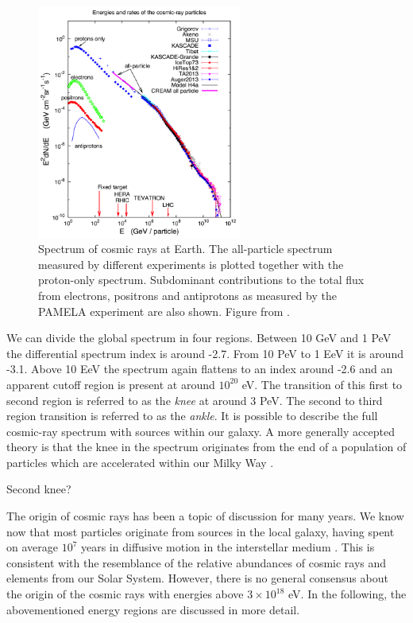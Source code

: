 \begin{figure}
\label{fig:spectrumCR}
\centering
\includegraphics[width = 0.6\textwidth]{chapter3/img/spectrumCR.png}
\caption{Spectrum of cosmic rays at Earth. The all-particle spectrum measured by different experiments is plotted together with the proton-only spectrum. Subdominant contributions to the total flux from electrons, positrons and antiprotons as measured by the PAMELA experiment are also shown. Figure from \cite{Blasi:2013rva}.}
\end{figure}

We can divide the global spectrum in four regions. Between 10 GeV and 1 PeV the differential spectrum index is around -2.7. From 10 PeV to 1 EeV it is around -3.1. Above 10 EeV the spectrum again flattens to an index around -2.6 and an apparent cutoff region is present at around $10^{20}$ eV. The transition of this first to second region is referred to as the \textit{knee} at around 3 PeV. The second to third region transition is referred to as the \textit{ankle}. It is possible to describe the full cosmic-ray spectrum with sources within our galaxy. A more generally accepted theory is that the knee in the spectrum originates from the end of a population of particles which are accelerated within our Milky Way \cite{Gaisser:2013bla}. 

Second knee?

The origin of cosmic rays has been a topic of discussion for many years. We know now that most particles originate from sources in the local galaxy, having spent on average $10^7$ years in diffusive motion in the interstellar medium \cite{Gaisser:2013bla}. This is consistent with the resemblance of the relative abundances of cosmic rays and elements from our Solar System. However, there is no general consensus about the origin of the cosmic rays with energies above $3 \times 10^{18}$ eV. In the following, the abovementioned energy regions are discussed in more detail.


